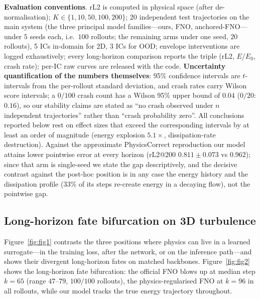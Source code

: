 \documentclass[11pt,a4paper]{article}
\begin{document}
\textbf{Evaluation conventions}. rL2 is computed in physical space (after de-normalisation); $K\in\{1,10,50,100,200\}$; $20$ independent test trajectories on the main system (the three principal model families---ours, FNO, anchored-FNO---under $5$ seeds each, i.e.\ $100$ rollouts; the remaining arms under one seed, $20$ rollouts), 5 ICs in-domain for 2D, 3 ICs for OOD; envelope interventions are logged exhaustively; every long-horizon comparison reports the triple (rL2, $E/E_0$, crash rate); per-IC raw curves are released with the code. \textbf{Uncertainty quantification of the numbers themselves}: 95\% confidence intervals are $t$-intervals from the per-rollout standard deviation, and crash rates carry Wilson score intervals; a $0/100$ crash count has a Wilson 95\% upper bound of $0.04$ ($0/20$: $0.16$), so our stability claims are stated as ``no crash observed under $n$ independent trajectories'' rather than ``crash probability zero''. All conclusions reported below rest on effect sizes that exceed the corresponding intervals by at least an order of magnitude (energy explosion $5.1\times$, dissipation-rate destruction). Against the approximate PhysicsCorrect reproduction our model attains lower pointwise error at every horizon (rL2@200 $0.811\pm0.073$ vs $0.962$); since that arm is single-seed we state the gap descriptively, and the decisive contrast against the post-hoc position is in any case the energy history and the dissipation profile ($33\%$ of its steps re-create energy in a decaying flow), not the pointwise gap.

\subsection{Long-horizon fate bifurcation on 3D turbulence}\label{sec:main}

Figure~\ref{fig:fig1} contrasts the three positions where physics can live in a learned surrogate---in the training loss, after the network, or on the inference path---and shows their divergent long-horizon fates on matched backbones. Figure~\ref{fig:fig2} shows the long-horizon fate bifurcation: the official FNO blows up at median step $k{=}65$ (range $47$--$79$, $100/100$ rollouts), the physics-regularised FNO at $k{=}96$ in all rollouts, while our model tracks the true energy trajectory throughout.
\end{document}
